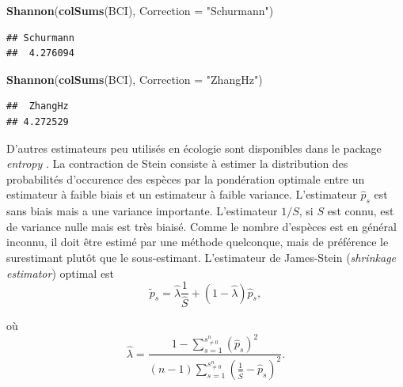 \documentclass[
  11pt,
  french,
  a4paper,
  extrafontsizes,onecolumn,openright
  ]{memoir}
\newenvironment{Shaded}{\begin{snugshade}}{\end{snugshade}}
\newcommand{\DataTypeTok}[1]{\textcolor[rgb]{0.13,0.29,0.53}{#1}}
\newcommand{\KeywordTok}[1]{\textcolor[rgb]{0.13,0.29,0.53}{\textbf{#1}}}
\newcommand{\NormalTok}[1]{#1}
\newcommand{\StringTok}[1]{\textcolor[rgb]{0.31,0.60,0.02}{#1}}
\begin{document}
\begin{Shaded}
\begin{Highlighting}[]
\KeywordTok{Shannon}\NormalTok{(}\KeywordTok{colSums}\NormalTok{(BCI), }\DataTypeTok{Correction =} \StringTok{"Schurmann"}\NormalTok{)}
\end{Highlighting}
\end{Shaded}

\begin{verbatim}
## Schurmann 
##  4.276094
\end{verbatim}

\begin{Shaded}
\begin{Highlighting}[]
\KeywordTok{Shannon}\NormalTok{(}\KeywordTok{colSums}\NormalTok{(BCI), }\DataTypeTok{Correction =} \StringTok{"ZhangHz"}\NormalTok{)}
\end{Highlighting}
\end{Shaded}

\begin{verbatim}
##  ZhangHz 
## 4.272529
\end{verbatim}

\normalsize

D'autres estimateurs peu utilisés en écologie sont disponibles dans le package \emph{entropy} \autocite{Hausser2009}.
La contraction de Stein \autocite{James1961} consiste à estimer la distribution des probabilités d'occurence des espèces par la pondération optimale entre un estimateur à faible biais et un estimateur à faible variance.
L'estimateur \(\hat{p}_s\) est sans biais mais a une variance importante.
L'estimateur \({1}/{S}\), si \(S\) est connu, est de variance nulle mais est très biaisé.
Comme le nombre d'espèces est en général inconnu, il doit être estimé par une méthode quelconque, mais de préférence le surestimant plutôt que le sous-estimant.
L'estimateur de James-Stein (\emph{shrinkage estimator}) optimal est
\begin{equation}
  \label{eq:JamesStein1}
  \tilde{p}_s = \hat{\lambda}\frac{1}{\hat{S}} + \left( 1-\hat{\lambda} \right)\hat{p}_s,
\end{equation}

où
\begin{equation}
  \label{eq:JamesStein2}
  \hat{\lambda} = \frac{1-\sum^{s^{n}_{\ne 0}}_{s=1}{\left( \hat{p}_s \right)^2}}
                  {\left( n-1 \right) \sum^{s^{n}_{\ne 0}}_{s=1}{\left( \frac{1}{\hat{S}} - \hat{p}_s \right)^2}}.
\end{equation}
\end{document}
